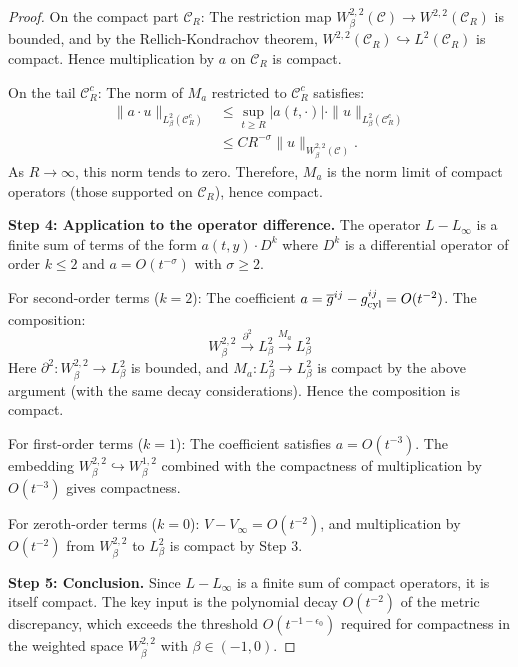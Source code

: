 \begin{proof}
On the compact part $\mathcal{C}_R$: The restriction map $W^{2,2}_\beta(\mathcal{C}) \to W^{2,2}(\mathcal{C}_R)$ is bounded, and by the Rellich-Kondrachov theorem, $W^{2,2}(\mathcal{C}_R) \hookrightarrow L^2(\mathcal{C}_R)$ is compact. Hence multiplication by $a$ on $\mathcal{C}_R$ is compact.

On the tail $\mathcal{C}_R^c$: The norm of $M_a$ restricted to $\mathcal{C}_R^c$ satisfies:
\begin{align*}
    \| a \cdot u \|_{L^2_\beta(\mathcal{C}_R^c)} &\le \sup_{t \ge R} |a(t,\cdot)| \cdot \| u \|_{L^2_\beta(\mathcal{C}_R^c)} \\
    &\le C R^{-\sigma} \| u \|_{W^{2,2}_\beta(\mathcal{C})}.
\end{align*}
As $R \to \infty$, this norm tends to zero. Therefore, $M_a$ is the norm limit of compact operators (those supported on $\mathcal{C}_R$), hence compact.

\textbf{Step 4: Application to the operator difference.}
The operator $L - L_\infty$ is a finite sum of terms of the form $a(t,y) \cdot D^k$ where $D^k$ is a differential operator of order $k \le 2$ and $a = O(t^{-\sigma})$ with $\sigma \ge 2$.

For second-order terms ($k = 2$): The coefficient $a = \overline{g}^{ij} - g_{\text{cyl}}^{ij} = O(t^{-2})$. The composition:
\[
    W^{2,2}_\beta \xrightarrow{\partial^2} L^2_\beta \xrightarrow{M_a} L^2_\beta
\]
Here $\partial^2 : W^{2,2}_\beta \to L^2_\beta$ is bounded, and $M_a : L^2_\beta \to L^2_\beta$ is compact by the above argument (with the same decay considerations). Hence the composition is compact.

For first-order terms ($k = 1$): The coefficient satisfies $a = O(t^{-3})$. The embedding $W^{2,2}_\beta \hookrightarrow W^{1,2}_\beta$ combined with the compactness of multiplication by $O(t^{-3})$ gives compactness.

For zeroth-order terms ($k = 0$): $V - V_\infty = O(t^{-2})$, and multiplication by $O(t^{-2})$ from $W^{2,2}_\beta$ to $L^2_\beta$ is compact by Step 3.

\textbf{Step 5: Conclusion.}
Since $L - L_\infty$ is a finite sum of compact operators, it is itself compact. The key input is the polynomial decay $O(t^{-2})$ of the metric discrepancy, which exceeds the threshold $O(t^{-1-\epsilon_0})$ required for compactness in the weighted space $W^{2,2}_\beta$ with $\beta \in (-1,0)$.
\end{proof}


